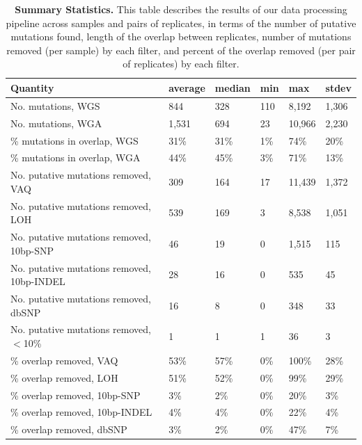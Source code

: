 \documentclass[11pt]{article} %
\begin{document}
\begin{landscape}
\begin{table}
\caption{\textbf{Summary Statistics.} This table describes the results of our data processing pipeline across samples and pairs of replicates, in terms of the number of putative mutations found, length of the overlap between replicates, number of mutations removed (per sample) by each filter, and percent of the overlap removed (per pair of replicates) by each filter.}
\label{tab:summary_stats}
\begin{tabular}{ p{8cm} p{2cm} p{2cm} p{2cm}p{2cm}p{2cm} }
	Quantity & average & median & min & max & stdev \\
	\hline
	No. mutations, WGS & 844 & 328 & 110 & 8,192 & 1,306 \\
	No. mutations, WGA & 1,531 & 694 & 23 & 10,966 & 2,230 \\
	\% mutations in overlap, WGS & 31\% & 31\% & 1\% & 74\% & 20\% \\
	\% mutations in overlap, WGA & 44\% & 45\% & 3\% & 71\% & 13\% \\
	No. putative mutations removed, VAQ & 309 & 164 & 17 & 11,439 & 1,372 \\
	No. putative mutations removed, LOH & 539 & 169 & 3 & 8,538 & 1,051 \\
	No. putative mutations removed, 10bp-SNP & 46 & 19 & 0 & 1,515 & 115 \\
	No. putative mutations removed, 10bp-INDEL & 28 & 16 & 0 & 535 & 45 \\
	No. putative mutations removed, dbSNP & 16 & 8 & 0 & 348 & 33 \\
	No. putative mutations removed, $<$10\% & 1 & 1 & 1 & 36 & 3 \\
	\% overlap removed, VAQ & 53\% & 57\% & 0\% & 100\% & 28\% \\
	\% overlap removed, LOH & 51\% & 52\% & 0\% & 99\% & 29\% \\
	\% overlap removed, 10bp-SNP & 3\% & 2\% & 0\% & 20\% & 3\% \\
	\% overlap removed, 10bp-INDEL & 4\% & 4\% & 0\% & 22\% & 4\% \\
	\% overlap removed, dbSNP & 3\% & 2\% & 0\% & 47\% & 7\% \\
\end{tabular}
\end{table}
\end{landscape}
\end{document}

